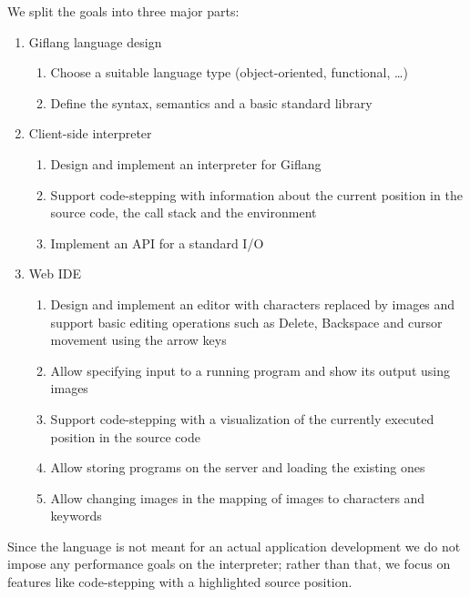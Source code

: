 We split the goals into three major parts:
\begin{enumerate}
\item Giflang language design
   \begin{enumerate}[label=(\alph*)]
     \item Choose a suitable language type (object-oriented, functional, \ldots)
	 \item Define the syntax, semantics and a basic standard library
   \end{enumerate}
\item Client-side interpreter
   \begin{enumerate}[label=(\alph*)]
	 \item Design and implement an interpreter for Giflang
	 \item Support code-stepping with information about the current position in the source code, the call stack and the environment
	 \item Implement an API for a standard I/O
   \end{enumerate}
\item Web IDE
   \begin{enumerate}[label=(\alph*)]
     \item Design and implement an editor with characters replaced by images and support basic editing operations such as Delete,
     Backspace and cursor movement using the arrow keys
	 \item Allow specifying input to a running program and show its output using images
	 \item Support code-stepping with a visualization of the currently executed position in the source code
	 \item Allow storing programs on the server and loading the existing ones
	 \item Allow changing images in the mapping of images to characters and keywords
	\end{enumerate}
\end{enumerate}

Since the language is not meant for an actual application development we do not impose any performance goals on the interpreter; rather than that, we
focus on features like code-stepping with a highlighted source position.
